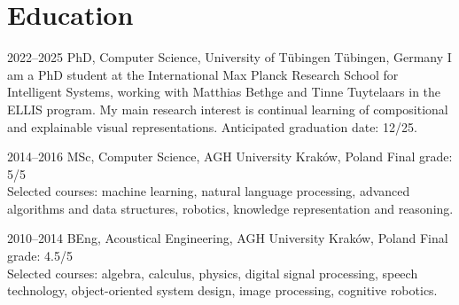 \documentclass[]{friggeri-cv_osx}
\begin{document}
\section{Education}
\begin{entrylist}

\entry
{2022–2025}
{PhD, Computer Science, University of Tübingen}
{Tübingen, Germany}
{I am a PhD student at the International Max Planck Research School for Intelligent Systems, working with Matthias Bethge and Tinne Tuytelaars in the ELLIS program. My main research interest is continual learning of compositional and explainable visual representations. Anticipated graduation date: 12/25.\\}

\entry
{2014–2016}
{MSc, Computer Science, AGH University}
{Kraków, Poland}
{Final grade: 5/5\\
Selected courses: machine learning, natural language processing, advanced algorithms and data structures, robotics, knowledge representation and reasoning.\\}

\entry
{2010–2014}
{BEng, Acoustical Engineering, AGH University}
{Kraków, Poland}
{Final grade: 4.5/5\\
Selected courses: algebra, calculus, physics, digital signal processing, speech technology, object-oriented system design, image processing, cognitive robotics.}
\end{entrylist}


\newpage
\end{document}
